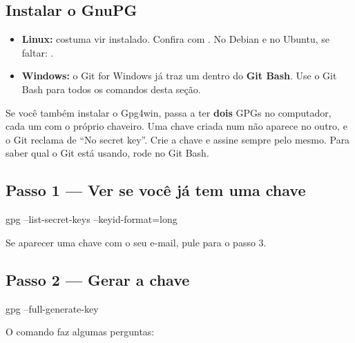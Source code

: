 \subsection{Instalar o GnuPG}

\begin{itemize}
  \item \textbf{Linux:} costuma vir instalado. Confira com . No Debian e no Ubuntu, se faltar: .
  \item \textbf{Windows:} o Git for Windows já traz um  dentro do \textbf{Git Bash}. Use o Git Bash para todos os comandos desta seção.
\end{itemize}

\begin{aviso}
Se você também instalar o Gpg4win, passa a ter \textbf{dois} GPGs no computador, cada um com o próprio chaveiro. Uma chave criada num não aparece no outro, e o Git reclama de \enquote{No secret key}. Crie a chave e assine sempre pelo mesmo. Para saber qual o Git está usando, rode  no Git Bash.
\end{aviso}

\subsection{Passo 1 — Ver se você já tem uma chave}

\begin{bashcode}
gpg --list-secret-keys --keyid-format=long
\end{bashcode}

Se aparecer uma chave com o seu e-mail, pule para o passo 3.

\subsection{Passo 2 — Gerar a chave}

\begin{bashcode}
gpg --full-generate-key
\end{bashcode}

O comando faz algumas perguntas:

